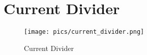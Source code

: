 \documentclass[report]{subfiles}
\begin{document}
\section{Current Divider}
\begin{figure}[htbp]
  \centering
  \texttt{[image: pics/current\_divider.png]}
  \caption{Current Divider \cite{lec6}}
  \label{fig:current_divider}
\end{figure} 
\end{document}
